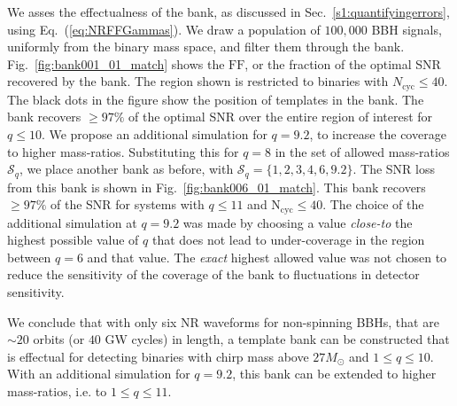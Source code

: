 \documentclass[aps,
prd,
twocolumn,
superscriptaddress,
lengthcheck,showpacs,letterpaper,nofootinbib,
floatfix]{revtex4-1}
\newcommand{\bnk}{\mathrm{bank}}
\newcommand{\FF}{\mathrm{FF}}
\newcommand{\N}{\mathrm{N}}
\newcommand{\cyc}{\mathrm{cyc}}
\begin{document}

We asses the effectualness of the bank, as discussed in 
Sec.~\ref{s1:quantifyingerrors}, using Eq.~(\ref{eq:NRFFGammas}).
We draw a population of $100,000$ BBH signals, uniformly from the binary 
mass space, and filter them through the bank. Fig.~\ref{fig:bank001_01_match}
shows the $\FF$, or the fraction of the optimal SNR recovered by the bank. 
The region shown is restricted to binaries with $N_{\cyc}\leq 40$.
The black dots in the figure show the position of templates in the bank. 
The bank recovers $\geq 97\%$ of the optimal SNR over the entire region 
of interest for $q\leq 10$. We 
propose an additional simulation for $q=9.2$, to increase the coverage to
higher mass-ratios. Substituting this for $q=8$ in the set of allowed 
mass-ratios $\mathcal{S}_q$, we place another bank as before, with
$\mathcal{S}_q=\{1,2,3,4,6,9.2\}$. The SNR loss from this bank is shown in
Fig.~\ref{fig:bank006_01_match}. This bank recovers $\geq 97\%$ of the SNR for
systems with $q\leq 11$ and $\N_{\cyc}\leq 40$. The choice of the additional
simulation at $q=9.2$ was made by choosing a value \textit{close-to} the 
highest possible value of $q$ that does not lead to under-coverage in the 
region between $q=6$ and that value. The \textit{exact} highest allowed 
value was not chosen to reduce the sensitivity of the coverage of the bank
to fluctuations in detector sensitivity.

We conclude that with only six NR waveforms for non-spinning BBHs, that are
$\sim 20$ orbits (or $40$ GW cycles) in length, a template bank can be
constructed that is effectual for detecting binaries with chirp mass above
$27M_\odot$ and $1\leq q\leq 10$. With an additional 
simulation for $q=9.2$, this bank can 
be extended to higher mass-ratios, i.e. to $1\leq q\leq 11$.
\end{document}
